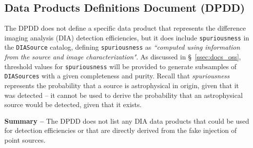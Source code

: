 \documentclass[DM,lsstdraft,toc]{lsstdoc}
\begin{document}


\subsection{Data Products Definitions Document (DPDD)}\label{ssec:docs_dpdd}

The DPDD  does not define a specific data product that represents the difference imaging analysis (DIA) detection efficiencies, but it does include {\tt spuriousness} in the {\tt DIASource} catalog, defining {\tt spuriousness} as {\it ``computed using information from the source and image characterization"}. As discussed in \S~\ref{ssec:docs_oss}, threshold values for {\tt spuriousness} will be provided to generate subsamples of {\tt DIASources} with a given completeness and purity. Recall that {\it spuriousness} represents the probability that a source is astrophysical in origin, given that it was detected -- it cannot be used to derive the probability that an astrophysical source would be detected, given that it exists.

{\bf Summary --} The DPDD does not list any DIA data products that could be used for detection efficiencies or that are directly derived from the fake injection of point sources.
\end{document}
